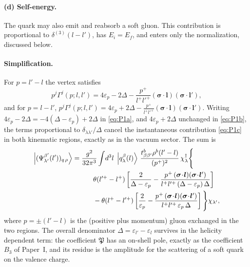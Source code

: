 \documentclass[11pt,a4paper]{article}
\numberwithin{equation}{section}
\newcommand{\mf}[1]{\mathfrak{#1}}
\newcommand{\eps}{\varepsilon}
\newcommand{\dg}{\dagger}
\newcommand{\dthree}{\delta^{(3)}}
\newcommand{\ket}[1]{\left|#1\right\rangle}
\newcommand{\Gam}{\Gamma}
\newcommand{\qk}[3]{q^{#1}_{#2}(#3)}
\begin{document}
\paragraph{(d) Self-energy.} The quark may also emit and reabsorb a soft gluon. This contribution
is proportional to $\dthree(l-l')$, has $E_{i}=E_{f}$, and enters only the normalization,
discussed below.

\paragraph{Simplification.} For $p=l'-l$ the vertex satisfies
\begin{equation}
p^{j}\Gam^{j}(p;l,l')=4\eps_{p}-2\Delta-\frac{p^{+}}{l^{+}l'^{+}}(\bm\sigma\!\cdot\!\bm l)(\bm\sigma\!\cdot\!\bm l'),
\label{eq:pGam1}
\end{equation}
and for $p=l-l'$, $p^{j}\Gam^{j}(p;l,l')=4\eps_{p}+2\Delta-\tfrac{p^{+}}{l^{+}l'^{+}}(\bm\sigma\!\cdot\!\bm l)(\bm\sigma\!\cdot\!\bm l')$.
Writing $4\eps_{p}-2\Delta=-4(\Delta-\eps_{p})+2\Delta$ in \eqref{eq:P1a}, and
$4\eps_{p}+2\Delta$ unchanged in \eqref{eq:P1b}, the terms proportional to
$\delta_{\lambda\lambda'}/\Delta$ cancel the instantaneous contribution \eqref{eq:P1c} in both
kinematic regions, exactly as in the vacuum sector. The sum is
\begin{align}
\ket{(\Psi^{\beta'}_{\lambda'}(l'))_{q\,\rho}}=\;&\frac{g^{2}}{32\pi^{3}}\int\!d^{3}l\;\ket{\qk{\beta}{\lambda}{l}}\,
\frac{t^{b}_{\beta\beta'}\rho^{b}(l'-l)}{(p^{+})^{2}}\,\chi^{\dg}_{\lambda}\Bigg\{
\nonumber\\&\hspace{0.6cm}
\theta(l'^{+}-l^{+})\left[\frac{2}{\Delta-\eps_{p}}
-\frac{p^{+}\,(\bm\sigma\!\cdot\!\bm l)(\bm\sigma\!\cdot\!\bm l')}{l^{+}l'^{+}\,(\Delta-\eps_{p})\,\Delta}\right]
\nonumber\\
&\hspace{0.6cm}-\theta(l^{+}-l'^{+})\left[\frac{2}{\eps_{p}}
-\frac{p^{+}\,(\bm\sigma\!\cdot\!\bm l)(\bm\sigma\!\cdot\!\bm l')}{l^{+}l'^{+}\,\eps_{p}\,\Delta}\right]\Bigg\}\chi_{\lambda'},
\label{eq:Pq-q}
\end{align}
where $p=\pm(l'-l)$ is the (positive plus momentum) gluon exchanged in the two regions. The
overall denominator $\Delta=\eps_{l'}-\eps_{l}$ survives in the helicity dependent term: the
coefficient $\mf P$ has an on-shell pole, exactly as the coefficient $B_{3}$ of Paper~I, and its
residue is the amplitude for the scattering of a soft quark on the valence charge.
\end{document}
